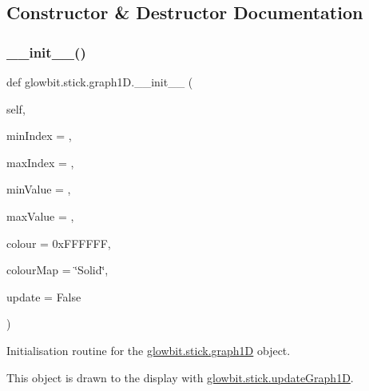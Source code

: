 \subsection{Constructor \& Destructor Documentation}
\mbox{\label{classglowbit_1_1stick_1_1graph1D_aebaa1206d7af5e1a1797bfdc6113cba8}} 
\subsubsection{\texorpdfstring{\+\_\+\+\_\+init\+\_\+\+\_\+()}{\_\_init\_\_()}}
{\footnotesize\ttfamily def glowbit.\+stick.\+graph1\+D.\+\_\+\+\_\+init\+\_\+\+\_\+ (\begin{DoxyParamCaption}\item[{}]{self,  }\item[{}]{min\+Index = {},  }\item[{}]{max\+Index = {},  }\item[{}]{min\+Value = {},  }\item[{}]{max\+Value = {},  }\item[{}]{colour = {\ttfamily 0xFFFFFF},  }\item[{}]{colour\+Map = {\ttfamily \char`\"{}Solid\char`\"{}},  }\item[{}]{update = {\ttfamily False} }\end{DoxyParamCaption})}



Initialisation routine for the \hyperlink{classglowbit_1_1stick_1_1graph1D}{glowbit.\+stick.\+graph1D} object. 

This object is drawn to the display with \hyperlink{classglowbit_1_1stick_acde1622da63c602b209a608384cb6020}{glowbit.\+stick.\+update\+Graph1D}.


